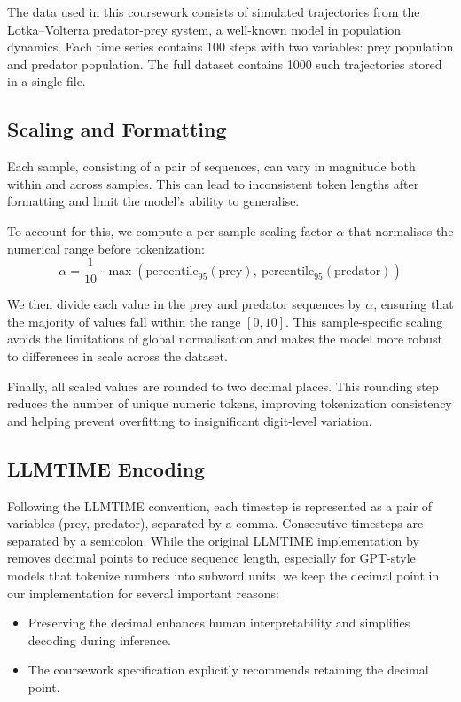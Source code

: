 \documentclass[a4paper,12pt]{article}
\begin{document}
The data used in this coursework consists of simulated trajectories from the Lotka–Volterra predator-prey system, a well-known model in population dynamics. Each time series contains 100 steps with two variables: prey population and predator population. The full dataset contains 1000 such trajectories stored in a single file.

\subsection*{Scaling and Formatting}

Each sample, consisting of a pair of sequences, can vary in magnitude both within and across samples. This can lead to inconsistent token lengths after formatting and limit the model’s ability to generalise.

To account for this, we compute a per-sample scaling factor $\alpha$ that normalises the numerical range before tokenization:
\begin{equation}
\alpha = \frac{1}{10} \cdot \max\left(\text{percentile}_{95}(\text{prey}),\ \text{percentile}_{95}(\text{predator})\right)
\end{equation}

We then divide each value in the prey and predator sequences by $\alpha$, ensuring that the majority of values fall within the range $[0, 10]$. This sample-specific scaling avoids the limitations of global normalisation and makes the model more robust to differences in scale across the dataset.

Finally, all scaled values are rounded to two decimal places. This rounding step reduces the number of unique numeric tokens, improving tokenization consistency and helping prevent overfitting to insignificant digit-level variation.


\subsection*{LLMTIME Encoding}

Following the LLMTIME convention, each timestep is represented as a pair of variables (prey, predator), separated by a comma. Consecutive timesteps are separated by a semicolon. While the original LLMTIME implementation by \citet{gruver2023language} removes decimal points to reduce sequence length, especially for GPT-style models that tokenize numbers into subword units, we keep the decimal point in our implementation for several important reasons:

\begin{itemize}
  \item Preserving the decimal enhances human interpretability and simplifies decoding during inference.
  \item The coursework specification explicitly recommends retaining the decimal point.
\end{itemize}
\end{document}
